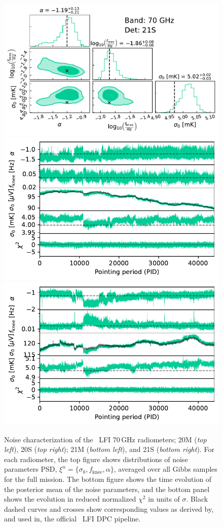 \documentclass[twocolumn]{aa}
\begin{document}
\begin{figure}[p]
\begin{center}
		\includegraphics[width=0.495\linewidth]{figs/corner_band_070_det_8_mean.pdf}\\
		\includegraphics[width=0.495\linewidth]{figs/xi_vs_pid_band_070_det_7_mean.pdf}
		\includegraphics[width=0.495\linewidth]{figs/xi_vs_pid_band_070_det_8_mean.pdf}
		 \vspace*{-5.5mm}            
	\end{center}
	
	\caption{Noise characterization of the \Planck\ LFI 70\,GHz
		radiometers; 20M (\emph{top left}), 20S (\emph{top right}); 21M
		(\emph{bottom left}), and 21S (\emph{bottom right}). For each
		radiometer, the top figure shows distributions of noise parameters
		PSD, $\xi^n = \{\sigma_0, f_\mathrm{knee}, \alpha\}$, averaged
		over all Gibbs samples for the full mission. The bottom figure
		shows the time evolution of the posterior mean of the noise
		parameters, and the bottom panel shows the evolution in reduced
		normalized $\chi^2$ in units of $\sigma$. Black dashed curves and crosses show corresponding values as derived by, and used in, the
		official \Planck\ LFI DPC pipeline.
		\label{fig:xi_prop_70_2}}
\end{figure}
\end{document}

